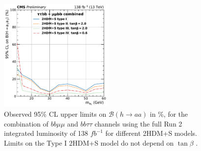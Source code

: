   \begin{figure}[h!]
    \begin{center}
      \includegraphics[width=0.5\textwidth]{figures/ch-13-results/HAA_comb_all_prelim.pdf}
    \end{center}
    \caption[Observed 95\% CL upper limits on $\mathcal{B}(h\to aa)$ in \%, for the combination of $bb\mu\mu$ and $bb\tau\tau$ channels using the full Run 2 integrated luminosity of 138 $fb^{-1}$ for different 2HDM+S models.]{Observed 95\% CL upper limits on $\mathcal{B}(h\to aa)$ in \%, for the combination of $bb\mu\mu$ and $bb\tau\tau$ channels using the full Run 2 integrated luminosity of 138 $fb^{-1}$ for different 2HDM+S models. Limits on the Type I 2HDM+S model do not depend on $\tan\beta$ \cite{CMS-AN-20-213}.}
      \label{fig:results_limits_combined}
  \end{figure}
  


